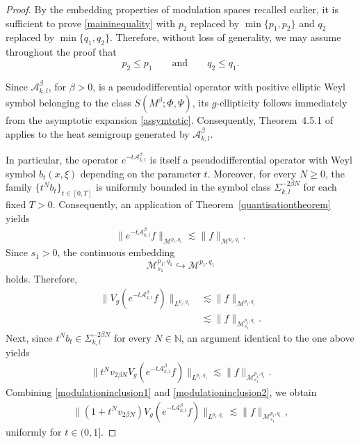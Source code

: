 \documentclass[12pt,reqno,a4paper]{amsart}
\numberwithin{equation}{section}
\theoremstyle{plain}
\theoremstyle{definition}
\theoremstyle{remark}
\begin{document}
\begin{proof}
By the embedding properties of modulation spaces recalled earlier, it is sufficient to prove \eqref{maininequality} with $p_{2}$ replaced by $\min\{p_{1},p_{2}\}$ and $q_{2}$ replaced by $\min\{q_{1},q_{2}\}$. Therefore, without loss of generality, we may assume throughout the proof that
\[
p_{2}\leq p_{1}
\qquad \text{and} \qquad
q_{2}\leq q_{1}.
\]

Since $\mathcal{A}_{k,l}^{\beta}$, for $\beta>0$, is a pseudodifferential operator with positive elliptic Weyl symbol belonging to the class $S(M^{\beta};\Phi,\Psi)$, its $g$-ellipticity follows immediately from the asymptotic expansion \eqref{assymtotic}. Consequently, Theorem~4.5.1 of \cite{MR2668420} applies to the heat semigroup generated by $\mathcal{A}_{k,l}^{\beta}$.

In particular, the operator $e^{-t\mathcal{A}_{k,l}^{\beta}}$ is itself a pseudodifferential operator with Weyl symbol $b_t(x,\xi)$ depending on the parameter $t$. Moreover, for every $N\geq 0$, the family $\{t^{N}b_t\}_{t\in[0,T]}$ is uniformly bounded in the symbol class $\Sigma^{-2\beta N}_{k,l}$ for each fixed $T>0$. Consequently, an application of Theorem~\ref{quantisationtheorem} yields
\begin{align*}
\|e^{-t\mathcal{A}_{k,l}^{\beta}}f\|_{\mathcal{M}^{p_{1},q_{1}}}
\lesssim
\|f\|_{\mathcal{M}^{p_{1},q_{1}}}.
\end{align*}
Since $s_{1}>0$, the continuous embedding
\[
\mathcal{M}^{p_{1},q_{1}}_{s_{1}}
\hookrightarrow
\mathcal{M}^{p_{1},q_{1}}
\]
holds. Therefore,
\begin{align}
\label{modulationinclusion1}
\|V_{g}(e^{-t\mathcal{A}_{k,l}^{\beta}}f)\|_{L^{p_{1},q_{1}}}
&\lesssim
\|f\|_{\mathcal{M}^{p_{1},q_{1}}}
\nonumber\\
&\lesssim
\|f\|_{\mathcal{M}^{p_{1},q_{1}}_{s_{1}}}.
\end{align}
Next, since $t^{N}b_t\in \Sigma^{-2\beta N}_{k,l}$ for every $N\in\mathbb{N}$, an argument identical to the one above yields
\begin{align}
\label{modulationinclusion2}
\|t^{N}v_{2\beta N}
V_{g}(e^{-t\mathcal{A}_{k,l}^{\beta}}f)\|_{L^{p_{1},q_{1}}}
\lesssim
\|f\|_{\mathcal{M}^{p_{1},q_{1}}_{s_{1}}}.
\end{align}
Combining \eqref{modulationinclusion1} and \eqref{modulationinclusion2}, we obtain
\begin{align}
\label{eqn012}
\|(1+t^{N}v_{2\beta N})
V_{g}(e^{-t\mathcal{A}_{k,l}^{\beta}}f)\|_{L^{p_{1},q_{1}}}
\lesssim
\|f\|_{\mathcal{M}^{p_{1},q_{1}}_{s_{1}}},
\end{align}
uniformly for $t\in(0,1]$.


\end{proof}
\end{document}
